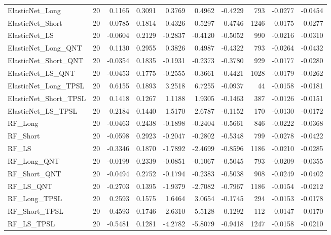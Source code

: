 \begin{tabular}{llrrrrrrrr}
\cline{1-10}
ElasticNet\_Long & 20 & 0.1165 & 0.3091 & 0.3769 & 0.4962 & -0.4229 & 793 & -0.0277 & -0.0454 \\
\cline{1-10}
ElasticNet\_Short & 20 & -0.0785 & 0.1814 & -0.4326 & -0.5297 & -0.4746 & 1246 & -0.0175 & -0.0277 \\
\cline{1-10}
ElasticNet\_LS & 20 & -0.0604 & 0.2129 & -0.2837 & -0.4120 & -0.5052 & 990 & -0.0216 & -0.0310 \\
\cline{1-10}
ElasticNet\_Long\_QNT & 20 & 0.1130 & 0.2955 & 0.3826 & 0.4987 & -0.4322 & 793 & -0.0264 & -0.0432 \\
\cline{1-10}
ElasticNet\_Short\_QNT & 20 & -0.0354 & 0.1835 & -0.1931 & -0.2373 & -0.3780 & 929 & -0.0177 & -0.0280 \\
\cline{1-10}
ElasticNet\_LS\_QNT & 20 & -0.0453 & 0.1775 & -0.2555 & -0.3661 & -0.4421 & 1028 & -0.0179 & -0.0262 \\
\cline{1-10}
ElasticNet\_Long\_TPSL & 20 & 0.6155 & 0.1893 & 3.2518 & 6.7255 & -0.0937 & 44 & -0.0158 & -0.0181 \\
\cline{1-10}
ElasticNet\_Short\_TPSL & 20 & 0.1418 & 0.1267 & 1.1188 & 1.9305 & -0.1463 & 387 & -0.0126 & -0.0151 \\
\cline{1-10}
ElasticNet\_LS\_TPSL & 20 & 0.2184 & 0.1440 & 1.5170 & 2.6787 & -0.1152 & 170 & -0.0130 & -0.0172 \\
\cline{1-10}
RF\_Long & 20 & -0.0463 & 0.2438 & -0.1898 & -0.2404 & -0.5661 & 846 & -0.0222 & -0.0368 \\
\cline{1-10}
RF\_Short & 20 & -0.0598 & 0.2923 & -0.2047 & -0.2802 & -0.5348 & 799 & -0.0278 & -0.0422 \\
\cline{1-10}
RF\_LS & 20 & -0.3346 & 0.1870 & -1.7892 & -2.4699 & -0.8596 & 1186 & -0.0210 & -0.0285 \\
\cline{1-10}
RF\_Long\_QNT & 20 & -0.0199 & 0.2339 & -0.0851 & -0.1067 & -0.5045 & 793 & -0.0209 & -0.0355 \\
\cline{1-10}
RF\_Short\_QNT & 20 & -0.0494 & 0.2752 & -0.1794 & -0.2383 & -0.5038 & 908 & -0.0249 & -0.0402 \\
\cline{1-10}
RF\_LS\_QNT & 20 & -0.2703 & 0.1395 & -1.9379 & -2.7082 & -0.7967 & 1186 & -0.0154 & -0.0212 \\
\cline{1-10}
RF\_Long\_TPSL & 20 & 0.2593 & 0.1575 & 1.6464 & 3.0654 & -0.1745 & 294 & -0.0153 & -0.0178 \\
\cline{1-10}
RF\_Short\_TPSL & 20 & 0.4593 & 0.1746 & 2.6310 & 5.5128 & -0.1292 & 112 & -0.0147 & -0.0170 \\
\cline{1-10}
RF\_LS\_TPSL & 20 & -0.5481 & 0.1281 & -4.2782 & -5.8079 & -0.9418 & 1247 & -0.0158 & -0.0210 \\

\end{tabular}
